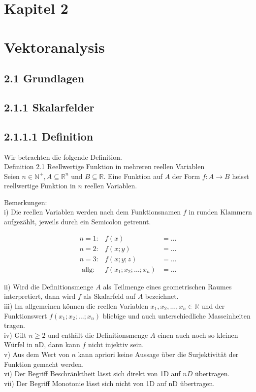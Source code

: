 \documentclass[10pt]{article}
\begin{document}
\section*{Kapitel 2}
\section*{Vektoranalysis}
\subsection*{2.1 Grundlagen}
\subsection*{2.1.1 Skalarfelder}
\subsection*{2.1.1.1 Definition}
Wir betrachten die folgende Definition.\\
Definition 2.1 Reellwertige Funktion in mehreren reellen Variablen\\
Seien $n \in \mathbb{N}^{+}, A \subseteq \mathbb{R}^{n}$ und $B \subseteq \mathbb{R}$. Eine Funktion auf $A$ der Form $f: A \rightarrow B$ heisst reellwertige Funktion in $n$ reellen Variablen.

Bemerkungen:\\
i) Die reellen Variablen werden nach dem Funktionsnamen $f$ in runden Klammern aufgezählt, jeweils durch ein Semicolon getrennt.


\begin{align*}
n=1: & f(x) & =\ldots  \tag{2.1}\\
n=2: & f(x ; y) & =\ldots  \tag{2.2}\\
n=3: & f(x ; y ; z) & =\ldots  \tag{2.3}\\
\text { allg: } & f\left(x_{1} ; x_{2} ; \ldots ; x_{n}\right) & =\ldots \tag{2.4}
\end{align*}


ii) Wird die Definitionsmenge $A$ als Teilmenge eines geometrischen Raumes interpretiert, dann wird $f$ als Skalarfeld auf $A$ bezeichnet.\\
iii) Im allgemeinen können die reellen Variablen $x_{1}, x_{2}, \ldots, x_{n} \in \mathbb{R}$ und der Funktionswert $f\left(x_{1} ; x_{2} ; \ldots ; x_{n}\right)$ bliebige und auch unterschiedliche Masseinheiten tragen.\\
iv) Gilt $n \geq 2$ und enthält die Definitionsmenge $A$ einen auch noch so kleinen Würfel in nD, dann kann $f$ nicht injektiv sein.\\
v) Aus dem Wert von $n$ kann apriori keine Aussage über die Surjektivität der Funktion gemacht werden.\\
vi) Der Begriff Beschränktheit lässt sich direkt von 1D auf $n D$ übertragen.\\
vii) Der Begriff Monotonie lässt sich nicht von 1D auf nD übertragen.
\end{document}
